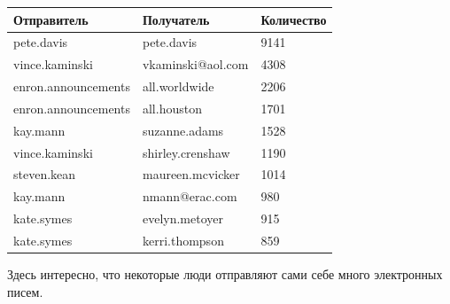 \begin{itemize}
\begin{center}
\begin{tabular}{ | l | l | l | }
\hline
Отправитель & Получатель & Количество \\ \hline
pete.davis & pete.davis & 9141 \\ \hline
vince.kaminski & vkaminski@aol.com & 4308 \\ \hline
enron.announcements & all.worldwide & 2206 \\ \hline
enron.announcements & all.houston & 1701 \\ \hline
kay.mann & suzanne.adams & 1528 \\ \hline
vince.kaminski & shirley.crenshaw & 1190 \\ \hline
steven.kean & maureen.mcvicker & 1014 \\ \hline
kay.mann & nmann@erac.com	 & 980 \\ \hline
kate.symes & evelyn.metoyer & 	915 \\ \hline
kate.symes & kerri.thompson	 & 859 \\ \hline
\end{tabular}
\end{center}

Здесь интересно, что некоторые люди отправляют сами себе много электронных писем.


\end{itemize}
